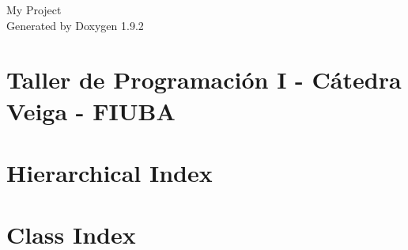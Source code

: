 \documentclass[twoside]{book}
\newcommand{\+}{\discretionary{\mbox{\scriptsize$\hookleftarrow$}}{}{}}
\newcommand{\clearemptydoublepage}{%
    \newpage{\pagestyle{empty}\cleardoublepage}%
  }
\begin{document}
  \raggedbottom
    \hypersetup{pageanchor=false,
                bookmarksnumbered=true,
                pdfencoding=unicode
               }
  \begin{titlepage}
  \vspace*{7cm}
  \begin{center}%
  {\Large My Project}\\
  \vspace*{1cm}
  {\large Generated by Doxygen 1.9.2}\\
  \end{center}
  \end{titlepage}
  \clearemptydoublepage
  \tableofcontents
  \clearemptydoublepage
  \hypersetup{pageanchor=true}
\chapter{Taller de Programación I -\/ Cátedra Veiga -\/ FIUBA}
\label{md_README}

\chapter{Hierarchical Index}

\chapter{Class Index}

\end{document}
